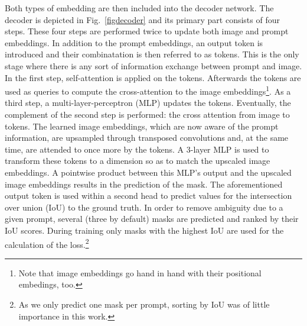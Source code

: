 Both types of embedding are then included into the decoder network. The decoder is depicted in Fig.~\ref{figdecoder} and its primary part consists of four steps. These four steps are performed twice to update both image and prompt embeddings. In addition to the prompt embeddings, an output token is introduced and their combinatation is then referred to as tokens. This is the only stage where there is any sort of information exchange between prompt and image. In the first step, self-attention is applied on the tokens. Afterwards the tokens are used as queries to compute the cross-attention to the image embeddings\footnote{Note that image embeddings go hand in hand with their positional embedings, too.}. As a third step, a multi-layer-perceptron (MLP) updates the tokens. Eventually, the complement of the second step is performed: the cross attention from image to tokens. The learned image embeddings, which are now aware of the prompt information, are upsampled through transposed convolutions and, at the same time, are attended to once more by the tokens. A 3-layer MLP is used to transform these tokens to a dimension so as to match the upscaled image embeddings. A pointwise product between this MLP's output and the upscaled image embeddings results in the prediction of the mask. The aforementioned output token is used within a second head to predict values for the intersection over union (IoU) to the ground truth. In order to remove ambiguity due to a given prompt, several (three by default) masks are predicted and ranked by their IoU scores. During training only masks with the highest IoU are used for the calculation of the loss.\footnote{As we only predict one mask per prompt, sorting by IoU was of little importance in this work.} 

